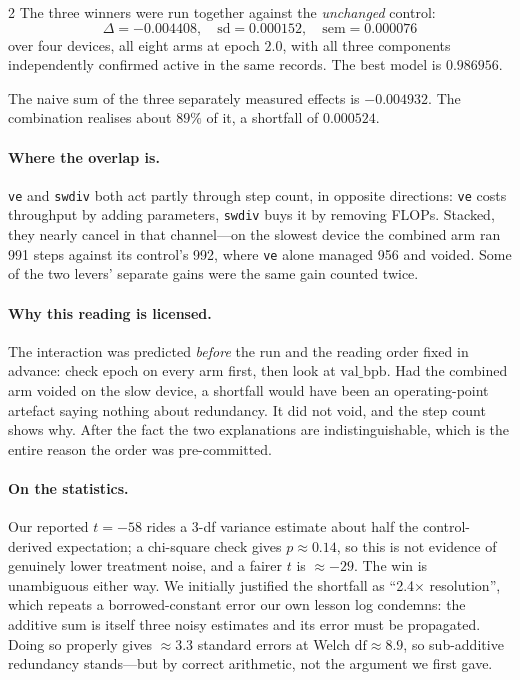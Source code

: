 \documentclass[10pt]{article}
\begin{document}
\begin{multicols}{2}
The three winners were run together against the \emph{unchanged} control:
\[
\Delta = -0.004408,\quad \mathrm{sd}=0.000152,\quad \mathrm{sem}=0.000076
\]
over four devices, all eight arms at epoch $2.0$, with all three components independently
confirmed active in the same records. The best model is $0.986956$.

The naive sum of the three separately measured effects is $-0.004932$. The combination
realises about $89\%$ of it, a shortfall of $0.000524$.

\paragraph{Where the overlap is.} \texttt{ve} and \texttt{swdiv} both act partly through
step count, in opposite directions: \texttt{ve} costs throughput by adding parameters,
\texttt{swdiv} buys it by removing FLOPs. Stacked, they nearly cancel in that
channel---on the slowest device the combined arm ran 991 steps against its control's 992,
where \texttt{ve} alone managed 956 and voided. Some of the two levers' separate gains
were the same gain counted twice.

\paragraph{Why this reading is licensed.} The interaction was predicted \emph{before} the
run and the reading order fixed in advance: check epoch on every arm first, then look at
$\mathrm{val\_bpb}$. Had the combined arm voided on the slow device, a shortfall would
have been an operating-point artefact saying nothing about redundancy. It did not void,
and the step count shows why. After the fact the two explanations are indistinguishable,
which is the entire reason the order was pre-committed.

\paragraph{On the statistics.} Our reported $t=-58$ rides a 3-df variance estimate about
half the control-derived expectation; a chi-square check gives $p\approx0.14$, so this is
not evidence of genuinely lower treatment noise, and a fairer $t$ is $\approx-29$. The win
is unambiguous either way. We initially justified the shortfall as ``2.4$\times$
resolution'', which repeats a borrowed-constant error our own lesson log condemns: the
additive sum is itself three noisy estimates and its error must be propagated. Doing so
properly gives $\approx$3.3 standard errors at Welch $\mathrm{df}\approx8.9$, so
sub-additive redundancy stands---but by correct arithmetic, not the argument we first
gave.



\end{multicols}
\end{document}
